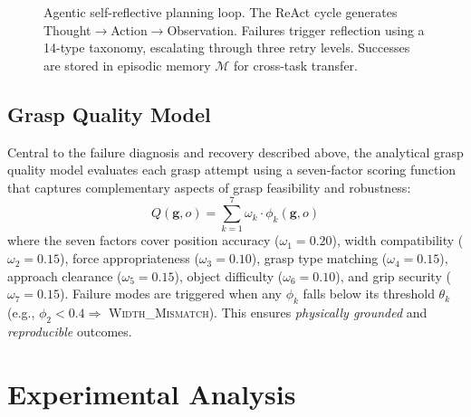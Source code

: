 \documentclass[letterpaper, 10pt, conference]{ieeeconf}
\begin{document}
\begin{figure}[t]
{
    }
    \caption{Agentic self-reflective planning loop. The ReAct cycle generates Thought$\to$Action$\to$Observation. Failures trigger reflection using a 14-type taxonomy, escalating through three retry levels. Successes are stored in episodic memory $\mathcal{M}$ for cross-task transfer.}
    \label{fig:agentic_loop}
\end{figure}

\subsection{Grasp Quality Model}
\label{sec:quality}

Central to the failure diagnosis and recovery described above, the analytical grasp quality model evaluates each grasp attempt using a seven-factor scoring function that captures complementary aspects of grasp feasibility and robustness:
\begin{equation}
    Q(\mathbf{g}, o) = \sum_{k=1}^{7} \omega_k \cdot \phi_k(\mathbf{g}, o)
    \label{eq:quality}
\end{equation}
where the seven factors cover position accuracy ($\omega_1{=}0.20$), width compatibility ($\omega_2{=}0.15$), force appropriateness ($\omega_3{=}0.10$), grasp type matching ($\omega_4{=}0.15$), approach clearance ($\omega_5{=}0.15$), object difficulty ($\omega_6{=}0.10$), and grip security ($\omega_7{=}0.15$).
Failure modes are triggered when any $\phi_k$ falls below its threshold $\theta_k$ (e.g., $\phi_2 < 0.4 \Rightarrow$ \textsc{Width\_Mismatch}).
This ensures \emph{physically grounded} and \emph{reproducible} outcomes.

\section{Experimental Analysis}
\label{sec:experiments}
\end{document}
